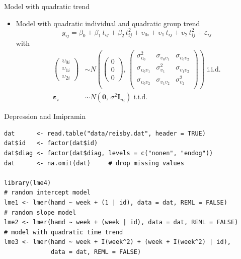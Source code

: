 \documentclass[aspectratio=169]{beamer}
\newcommand{\vect}[1]{\mathbf{#1}}
\newcommand{\mat}[1]{\mathbf{#1}}
\newcommand{\gvect}[1]{\boldsymbol{#1}}
\begin{document}
\begin{frame}[fragile]{Model with quadratic trend}
  \begin{itemize}
    \item Model with quadratic individual and quadratic group trend
      \[
 y_{ij} = \beta_0 + \beta_1\,t_{ij} + \beta_2\,t^2_{ij} + \upsilon_{0i} +
      \upsilon_1\,t_{ij} + \upsilon_2\,t^2_{ij} + \varepsilon_{ij}
      \]
with
\begin{align*}
  \begin{pmatrix}
    \upsilon_{0i}\\
    \upsilon_{1i}\\
    \upsilon_{2i}
  \end{pmatrix} &\sim
  N \left(\begin{pmatrix}
      0\\ 0\\ 0
  \end{pmatrix}, \,
  \begin{pmatrix}
    \sigma^2_{\upsilon_0} & \sigma_{\upsilon_0 \upsilon_1} & \sigma_{\upsilon_0 \upsilon_2}\\
    \sigma_{\upsilon_0 \upsilon_1} & \sigma^2_{\upsilon_1} & \sigma_{\upsilon_1 \upsilon_2}\\
    \sigma_{\upsilon_0 \upsilon_2} & \sigma_{\upsilon_1 \upsilon_2} & \sigma^2_{\upsilon_2}\\
      \end{pmatrix} \right)
    \text{ i.i.d.} \\
  \gvect{\varepsilon}_i &\sim N(\vect{0}, \, \sigma^2 \mat{I}_{n_i})
    \text{ i.i.d.}
\end{align*}
  \end{itemize}
\vspace{-.5cm}
\end{frame}

\begin{frame}[fragile]{Depression and Imipramin}
  \begin{lstlisting}
dat      <- read.table("data/reisby.dat", header = TRUE)
dat$id   <- factor(dat$id)
dat$diag <- factor(dat$diag, levels = c("nonen", "endog"))
dat      <- na.omit(dat)     # drop missing values

library(lme4)
# random intercept model
lme1 <- lmer(hamd ~ week + (1 | id), data = dat, REML = FALSE)
# random slope model
lme2 <- lmer(hamd ~ week + (week | id), data = dat, REML = FALSE)
# model with quadratic time trend
lme3 <- lmer(hamd ~ week + I(week^2) + (week + I(week^2) | id),
             data = dat, REML = FALSE)
  \end{lstlisting}
\end{frame}
\end{document}
